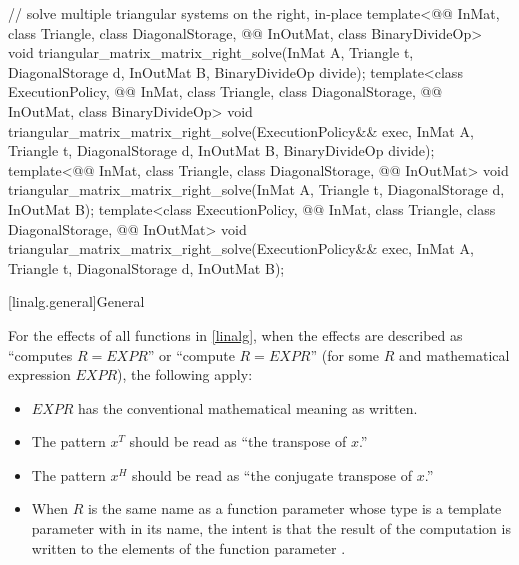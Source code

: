 \begin{codeblock}
{  // solve multiple triangular systems on the right, in-place
  template<@@ InMat, class Triangle, class DiagonalStorage,
           @@ InOutMat, class BinaryDivideOp>
    void triangular_matrix_matrix_right_solve(InMat A, Triangle t, DiagonalStorage d,
                                              InOutMat B, BinaryDivideOp divide);
  template<class ExecutionPolicy,
           @@ InMat, class Triangle, class DiagonalStorage,
           @@ InOutMat, class BinaryDivideOp>
    void triangular_matrix_matrix_right_solve(ExecutionPolicy&& exec,
                                              InMat A, Triangle t, DiagonalStorage d,
                                              InOutMat B, BinaryDivideOp divide);
  template<@@ InMat, class Triangle, class DiagonalStorage, @@ InOutMat>
    void triangular_matrix_matrix_right_solve(InMat A, Triangle t, DiagonalStorage d,
                                              InOutMat B);
  template<class ExecutionPolicy,
           @@ InMat, class Triangle, class DiagonalStorage, @@ InOutMat>
    void triangular_matrix_matrix_right_solve(ExecutionPolicy&& exec,
                                              InMat A, Triangle t, DiagonalStorage d,
                                              InOutMat B);
}
\end{codeblock}

[linalg.general]{General}

\pnum
For the effects of all functions in \ref{linalg},
when the effects are described as
``computes $R = EXPR$'' or ``compute $R = EXPR$''
(for some $R$ and mathematical expression $EXPR$),
the following apply:
\begin{itemize}
\item
$EXPR$ has
      the conventional mathematical meaning as written.
\item
The pattern $x^T$ should be read as
      ``the transpose of $x$.''
\item
The pattern $x^H$ should be read as
      ``the conjugate transpose of $x$.''
\item
When $R$ is the same name as a function parameter
      whose type is a template parameter with  in its name,
      the intent is that the result of the computation
      is written to the elements of the function parameter .
\end{itemize}

